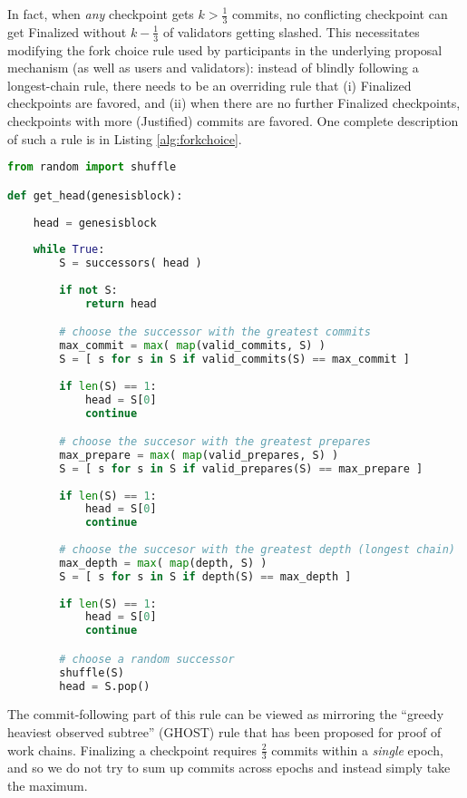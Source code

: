 \documentclass[12pt]{article}
\begin{document}
In fact, when \textit{any} checkpoint gets $k > \frac{1}{3}$ commits, no conflicting checkpoint can get Finalized without $k - \frac{1}{3}$ of validators getting slashed. This necessitates modifying the fork choice rule used by participants in the underlying proposal mechanism (as well as users and validators): instead of blindly following a longest-chain rule, there needs to be an overriding rule that (i) Finalized checkpoints are favored, and (ii) when there are no further Finalized checkpoints, checkpoints with more (Justified) commits are favored.  One complete description of such a rule is in Listing \ref{alg:forkchoice}.

\begin{lstlisting}[language=Python, caption={Algorithm for determining the head}, captionpos=b, label={alg:forkchoice}]
from random import shuffle

def get_head(genesisblock):
    
    head = genesisblock
    
    while True:
        S = successors( head )
        
        if not S:
            return head

        # choose the successor with the greatest commits
        max_commit = max( map(valid_commits, S) )        
        S = [ s for s in S if valid_commits(S) == max_commit ]
        
        if len(S) == 1:
            head = S[0]
            continue

        # choose the succesor with the greatest prepares
        max_prepare = max( map(valid_prepares, S) )
        S = [ s for s in S if valid_prepares(S) == max_prepare ]
        
        if len(S) == 1:
            head = S[0]
            continue
        
        # choose the succesor with the greatest depth (longest chain)
        max_depth = max( map(depth, S) )
        S = [ s for s in S if depth(S) == max_depth ]
        
        if len(S) == 1:
            head = S[0]
            continue

        # choose a random successor
        shuffle(S)
        head = S.pop()

\end{lstlisting}

The commit-following part of this rule can be viewed as mirroring the ``greedy heaviest observed subtree'' (GHOST) rule that has been proposed for proof of work chains\cite{sompolinsky2013accelerating}. Finalizing a checkpoint requires $\frac{2}{3}$ commits within a \textit{single} epoch,  and so we do not try to sum up commits across epochs and instead simply take the maximum. 
\end{document}
